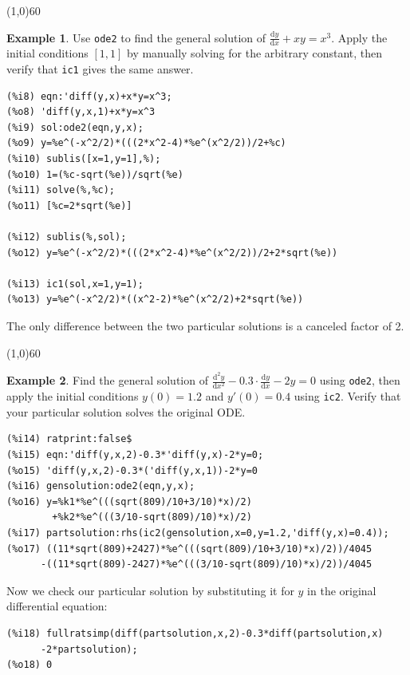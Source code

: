\documentclass[10.5pt,twoside]{report}
\theoremstyle{definition}
\newtheorem{exmp}{Example}[section]
\begin{document}
\line(1,0){60}
\linethickness{0.5mm}


\begin{exmp} Use \verb|ode2| to find the general solution of $\frac{\mathrm{d}y}{\mathrm{d}x}+xy=x^3$.  Apply the initial conditions $[1,1]$ by manually solving for the arbitrary constant, then verify that \verb|ic1| gives the same answer.

\begin{verbatim}
(%i8) eqn:'diff(y,x)+x*y=x^3;
(%o8) 'diff(y,x,1)+x*y=x^3
(%i9) sol:ode2(eqn,y,x);
(%o9) y=%e^(-x^2/2)*(((2*x^2-4)*%e^(x^2/2))/2+%c)
(%i10) sublis([x=1,y=1],%);
(%o10) 1=(%c-sqrt(%e))/sqrt(%e)
(%i11) solve(%,%c);
(%o11) [%c=2*sqrt(%e)]

(%i12) sublis(%,sol);
(%o12) y=%e^(-x^2/2)*(((2*x^2-4)*%e^(x^2/2))/2+2*sqrt(%e))

(%i13) ic1(sol,x=1,y=1);
(%o13) y=%e^(-x^2/2)*((x^2-2)*%e^(x^2/2)+2*sqrt(%e))
\end{verbatim}

The only difference between the two particular solutions is a canceled factor of 2.

\end{exmp}

\line(1,0){60}
\linethickness{0.5mm}


\begin{exmp} Find the general solution of $\frac{\mathrm{d}^2 y}{\mathrm{d} x^2}-0.3\cdot \frac{\mathrm{d}y}{\mathrm{d}x}-2y=0$ using \verb|ode2|, then apply the initial conditions $y(0)=1.2$ and $y'(0)=0.4$ using \verb|ic2|.  Verify that your particular solution solves the original ODE.

\begin{verbatim}
(%i14) ratprint:false$
(%i15) eqn:'diff(y,x,2)-0.3*'diff(y,x)-2*y=0;
(%o15) 'diff(y,x,2)-0.3*('diff(y,x,1))-2*y=0
(%i16) gensolution:ode2(eqn,y,x);
(%o16) y=%k1*%e^(((sqrt(809)/10+3/10)*x)/2)
        +%k2*%e^(((3/10-sqrt(809)/10)*x)/2)
(%i17) partsolution:rhs(ic2(gensolution,x=0,y=1.2,'diff(y,x)=0.4));
(%o17) ((11*sqrt(809)+2427)*%e^(((sqrt(809)/10+3/10)*x)/2))/4045
      -((11*sqrt(809)-2427)*%e^(((3/10-sqrt(809)/10)*x)/2))/4045
\end{verbatim}

Now we check our particular solution by substituting it for $y$ in the original differential equation:

\begin{verbatim}
(%i18) fullratsimp(diff(partsolution,x,2)-0.3*diff(partsolution,x)
      -2*partsolution);
(%o18) 0
\end{verbatim}


\end{exmp}
\end{document}
